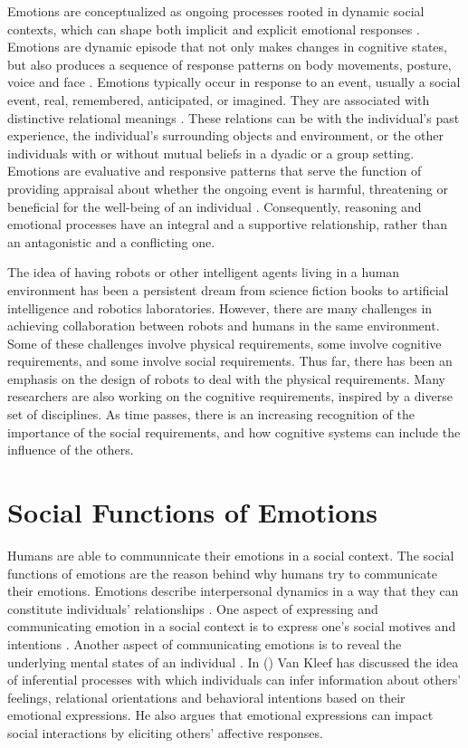 \documentclass[letterpaper]{article}
\begin{document}
Emotions are conceptualized as ongoing processes rooted in dynamic social
contexts, which can shape both implicit and explicit emotional responses
\cite{parkinson:emotion-social-interaction}. Emotions are dynamic episode that
not only makes changes in cognitive states, but also produces a sequence of
response patterns on body movements, posture, voice and face
\cite{scherer:expression-appraisal}. Emotions typically occur in response to an
event, usually a social event, real, remembered, anticipated, or imagined. They
are associated with distinctive relational meanings
\cite{parkinson:holds-emotion}. These relations can be with the individual's
past experience, the individual's surrounding objects and environment, or the
other individuals with or without mutual beliefs in a dyadic or a group setting.
Emotions are evaluative and responsive patterns that serve the function of
providing appraisal about whether the ongoing event is harmful, threatening or
beneficial for the well-being of an individual \cite{zhu:emotion-action}.
Consequently, reasoning and emotional processes have an integral and a
supportive relationship, rather than an antagonistic and a conflicting one.

The idea of having robots or other intelligent agents living in a human
environment has been a persistent dream from science fiction books to artificial
intelligence and robotics laboratories. However, there are many challenges in
achieving collaboration between robots and humans in the same environment. Some
of these challenges involve physical requirements, some involve cognitive
requirements, and some involve social requirements. Thus far, there has been an
emphasis on the design of robots to deal with the physical requirements. Many
researchers are also working on the cognitive requirements, inspired by a
diverse set of disciplines. As time passes, there is an increasing recognition
of the importance of the social requirements, and how cognitive systems can
include the influence of the others.

\section{Social Functions of Emotions}

Humans are able to communnicate their emotions in a social context. The social
functions of emotions are the reason behind why humans try to communicate their
emotions. Emotions describe interpersonal dynamics in a way that they can
constitute individuals' relationships
\cite{parkinson:emotions-social,tiedens:social-life}. One aspect of expressing
and communicating emotion in a social context is to express one's social motives
and intentions \cite{hess:darwin-emotion}. Another aspect of communicating
emotions is to reveal the underlying mental states of an individual
\cite{parkinson:emotion-communication}. In
(\citeyear{kleef:emotion-regulate-social}) Van Kleef has discussed the idea of
inferential processes with which individuals can infer information about others'
feelings, relational orientations and behavioral intentions based on their
emotional expressions. He also argues that emotional expressions can impact
social interactions by eliciting others' affective responses.
\end{document}
